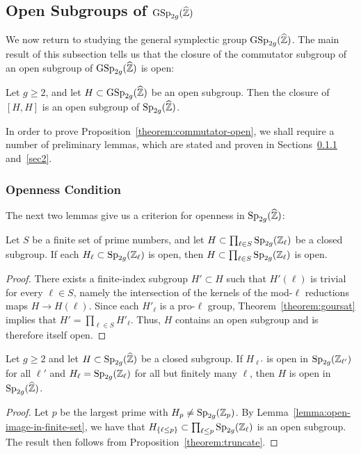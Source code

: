 	
	\subsection{Open Subgroups of $\operatorname{GSp}_{2g}(\widehat{\mathbb Z})$}
	\label{subsection:open-subgroups}
We now return to studying the general symplectic group $\operatorname{GSp}_{2g}(\widehat{\mathbb Z})$. The main result of this subsection tells us that the closure of the commutator subgroup of an open subgroup of $\operatorname{GSp}_{2g}(\widehat{\mathbb Z})$ is open:


\begin{proposition} \label{theorem:commutator-open}
Let $g \geq 2$, and let $H \subset \operatorname{GSp}_{2g}(\widehat{{\mathbb Z}})$ be an open subgroup. Then the closure of $[H, H]$ is an open subgroup of $\operatorname{Sp}_{2g}(\widehat{{\mathbb Z}})$.
\end{proposition}

In order to prove Proposition~\ref{theorem:commutator-open}, we shall require a number of preliminary lemmas, which are stated and proven in Sections~\ref{sec1} and~\ref{sec2}.

\subsubsection{Openness Condition}\label{sec1}

The next two lemmas give us a criterion for openness in $\operatorname{Sp}_{2g}(\widehat{{\mathbb Z}})$:

\begin{lemma}
		\label{lemma:open-image-in-finite-set}
		Let $S$ be a finite set of prime numbers, and let $H \subset \prod_{\ell \in S} \operatorname{Sp}_{2g}({\mathbb Z}_\ell)$ be a closed subgroup. If each $H_\ell \subset \operatorname{Sp}_{2g}({\mathbb Z}_\ell)$ is open, then $H \subset \prod_{\ell \in S} \operatorname{Sp}_{2g}({\mathbb Z}_\ell)$ is open.
	\end{lemma}
	\begin{proof}
		There exists a finite-index subgroup $H' \subset H$ such that $H'(\ell)$ is trivial for every $\ell \in S$, namely the intersection of the kernels of the mod-$\ell$ reductions maps $H \to H(\ell)$. Since each $H'_\ell$ is a pro-$\ell$ group, Theorem~\ref{theorem:goursat} implies that $H' = \prod_{\ell \in S} H'_\ell$.
		Thus, $H$ contains an open subgroup and is therefore itself open.
	\end{proof}

       \begin{lemma}
		\label{theorem:adelic-open}
		Let $g \geq 2$ and let $H \subset \operatorname{Sp}_{2g}(\widehat{{\mathbb Z}})$ be a closed subgroup. If $H_{\ell'}$ is open in $\operatorname{Sp}_{2g}({\mathbb Z}_{\ell'})$ for all $\ell'$ and $H_\ell = \operatorname{Sp}_{2g}({\mathbb Z}_\ell)$ for all but finitely many $\ell$, then $H$ is open in $\operatorname{Sp}_{2g}(\widehat{{\mathbb Z}})$.
	\end{lemma}
	\begin{proof}
		Let $p$ be the largest prime with $H_{p} \neq \operatorname{Sp}_{2g}(\mathbb Z_{p})$. By Lemma~\ref{lemma:open-image-in-finite-set}, we have that  $H_{\{\ell \le p\}} \subset \prod_{\ell \le p} \operatorname{Sp}_{2g}(\mathbb Z_\ell)$ is an open subgroup.
		The result then follows from Proposition~\ref{theorem:truncate}.
	\end{proof}


